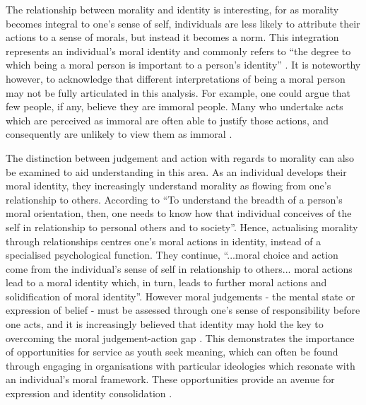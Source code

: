The relationship between morality and identity is interesting, for as morality becomes integral to one's sense of self, individuals are less likely to attribute their actions to a sense of morals, but instead it becomes a norm. This integration represents an individual's moral identity and commonly refers to “the degree to which being a moral person is important to a person's identity” \citep[][p212]{Hardy2011a}. It is noteworthy however, to acknowledge that different interpretations of being a moral person may not be fully articulated in this analysis. For example, one could argue that few people, if any, believe they are immoral people. Many who undertake acts which are perceived as immoral are often able to justify those actions, and consequently are unlikely to view them as immoral \citep[see][]{Bandura1999}. 

The distinction between judgement and action with regards to morality can also be examined to aid understanding in this area. As an individual develops their moral identity, they increasingly understand morality as flowing from one's relationship to others. According to \citet[][p372]{Youniss1999a} “To understand the breadth of a person's moral orientation, then, one needs to know how that individual conceives of the self in relationship to personal others and to society”. Hence, actualising morality through relationships centres one's moral actions in identity, instead of a specialised psychological function. They continue, “...moral choice and action come from the individual's sense of self in relationship to others... moral actions lead to a moral identity which, in turn, leads to further moral actions and solidification of moral identity”. However moral judgements - the mental state or expression of belief - must be assessed through one's sense of responsibility before one acts, and it is increasingly believed that identity may hold the key to overcoming the moral judgement-action gap \citep[][see also \citealp{Hart1995}]{Hardy2011a}. This demonstrates the importance of opportunities for service as youth seek meaning, which can often be found through engaging in organisations with particular ideologies which resonate with an individual's moral framework. These opportunities provide an avenue for expression and identity consolidation \citep{Youniss1999a}. 

